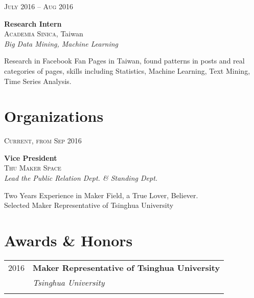 \documentclass[10pt]{article} %
\begin{document}
{\begin{minipage}[t]{0.5\textwidth}
{\raggedleft\textsc{July 2016 -- Aug 2016}\par} 

{\raggedright\large \textbf{Research Intern} \\ \textsc{Academia Sinica}, Taiwan\\
\textit{Big Data Mining, Machine Learning}\\[5pt]}

\normalsize{Research in Facebook Fan Pages in Taiwan, found patterns in posts and real categories of pages, skills including Statistics, Machine Learning, Text Mining, Time Series Analysis.}\\


\section{Organizations}

{\raggedleft\textsc{Current, from Sep 2016}\par}

{\raggedright\large \textbf{Vice President} \\ \textsc{Thu Maker Space}
\\
\textit{Lead the Public Relation Dept. \& Standing Dept.}\\[5pt]}

\normalsize{Two Years Experience in Maker Field, a True Lover, Believer.\\Selected Maker Representative of Tsinghua University}\\



\section{Awards \& Honors} 

\begin{tabular}{rl}
2016	 & \textbf{Maker Representative of Tsinghua University}\\
& \textit{Tsinghua University}\\ \\


\end{tabular}
\end{minipage}}
\end{document}
